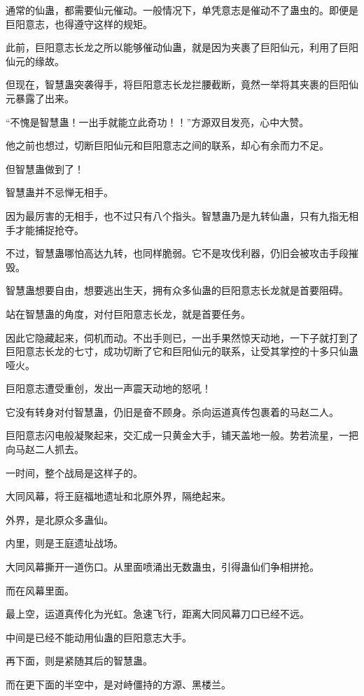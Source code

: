 
\begin{this_body}

通常的仙蛊，都需要仙元催动。一般情况下，单凭意志是催动不了蛊虫的。即便是巨阳意志，也得遵守这样的规矩。

此前，巨阳意志长龙之所以能够催动仙蛊，就是因为夹裹了巨阳仙元，利用了巨阳仙元的缘故。

但现在，智慧蛊突袭得手，将巨阳意志长龙拦腰截断，竟然一举将其夹裹的巨阳仙元暴露了出来。

“不愧是智慧蛊！一出手就能立此奇功！！”方源双目发亮，心中大赞。

他之前也想过，切断巨阳仙元和巨阳意志之间的联系，却心有余而力不足。

但智慧蛊做到了！

智慧蛊并不忌惮无相手。

因为最厉害的无相手，也不过只有八个指头。智慧蛊乃是九转仙蛊，只有九指无相手才能捕捉抢夺。

不过，智慧蛊哪怕高达九转，也同样脆弱。它不是攻伐利器，仍旧会被攻击手段摧毁。

智慧蛊想要自由，想要逃出生天，拥有众多仙蛊的巨阳意志长龙就是首要阻碍。

站在智慧蛊的角度，对付巨阳意志长龙，就是首要任务。

因此它隐藏起来，伺机而动。不出手则已，一出手果然惊天动地，一下子就打到了巨阳意志长龙的七寸，成功切断了它和巨阳仙元的联系，让受其掌控的十多只仙蛊哑火。

巨阳意志遭受重创，发出一声震天动地的怒吼！

它没有转身对付智慧蛊，仍旧是奋不顾身。杀向运道真传包裹着的马赵二人。

巨阳意志闪电般凝聚起来，交汇成一只黄金大手，铺天盖地一般。势若流星，一把向马赵二人抓去。

一时间，整个战局是这样子的。

大同风幕，将王庭福地遗址和北原外界，隔绝起来。

外界，是北原众多蛊仙。

内里，则是王庭遗址战场。

大同风幕撕开一道伤口。从里面喷涌出无数蛊虫，引得蛊仙们争相拼抢。

而在风幕里面。

最上空，运道真传化为光虹。急速飞行，距离大同风幕刀口已经不远。

中间是已经不能动用仙蛊的巨阳意志大手。

再下面，则是紧随其后的智慧蛊。

而在更下面的半空中，是对峙僵持的方源、黑楼兰。


\end{this_body}
